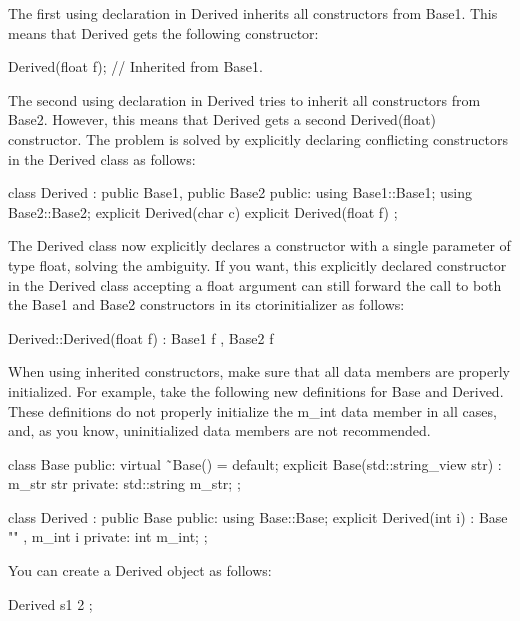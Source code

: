 The first using declaration in Derived inherits all constructors from Base1. This means that Derived gets the following constructor:

\begin{cpp}
Derived(float f); // Inherited from Base1.
\end{cpp}

The second using declaration in Derived tries to inherit all constructors from Base2. However, this means that Derived gets a second Derived(float) constructor. The problem is solved by explicitly declaring conflicting constructors in the Derived class as follows:

\begin{cpp}
class Derived : public Base1, public Base2
{
    public:
        using Base1::Base1;
        using Base2::Base2;
        explicit Derived(char c) {}
        explicit Derived(float f) {}
};
\end{cpp}

The Derived class now explicitly declares a constructor with a single parameter of type float, solving the ambiguity. If you want, this explicitly declared constructor in the Derived class accepting a float argument can still forward the call to both the Base1 and Base2 constructors in its ctorinitializer as follows:

\begin{cpp}
Derived::Derived(float f) : Base1 { f }, Base2 { f } {}
\end{cpp}


When using inherited constructors, make sure that all data members are properly initialized. For example, take the following new definitions for Base and Derived. These definitions do not properly initialize the m\_int data member in all cases, and, as you know, uninitialized data members are not recommended.

\begin{cpp}
class Base
{
    public:
        virtual ˜Base() = default;
        explicit Base(std::string_view str) : m_str { str } {}
    private:
        std::string m_str;
};

class Derived : public Base
{
    public:
        using Base::Base;
        explicit Derived(int i) : Base { "" }, m_int { i } {}
    private:
        int m_int;
};
\end{cpp}

You can create a Derived object as follows:

\begin{cpp}
Derived s1 { 2 };
\end{cpp}

